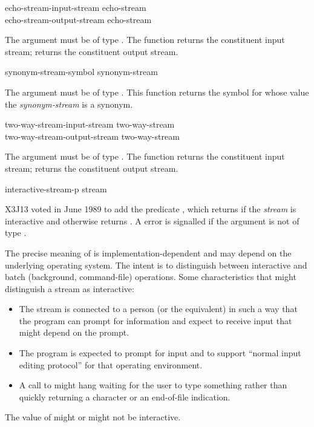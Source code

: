 \begin{defun}[Function]
echo-stream-input-stream echo-stream \\
echo-stream-output-stream echo-stream

The argument must be of type .
The function  returns the constituent
input stream;  returns the constituent
output stream.
\end{defun}


\begin{defun}[Function]
synonym-stream-symbol synonym-stream

The argument must be of type .  This function returns
the symbol for whose value the \emph{synonym-stream} is a synonym.
\end{defun}

\begin{defun}[Function]
two-way-stream-input-stream two-way-stream \\
two-way-stream-output-stream two-way-stream

The argument must be of type .
The function  returns the constituent
input stream;  returns the constituent
output stream.
\end{defun}

\begin{defun}[Function]
interactive-stream-p stream

X3J13 voted in June 1989  to add the
predicate , which returns 
if the \emph{stream\/} is interactive and otherwise returns .
A  error is signalled if the argument is not of type .

The precise meaning of  is implementation-dependent
and may depend on the underlying operating system.
The intent is to distinguish between interactive and batch (background,
command-file) operations.  Some characteristics that might
distinguish a stream as interactive:
\begin{itemize}
\item The stream is connected to a person (or the equivalent)
in such a way that the program can prompt for information and
expect to receive input that might depend on the prompt.
\item The program is expected to prompt for input and to support
``normal input editing protocol'' for that operating environment.
\item A call to  might hang waiting for the user to type something
rather than quickly returning a character or an end-of-file
indication.
\end{itemize}
The value of  might or might not be interactive.
\end{defun}

